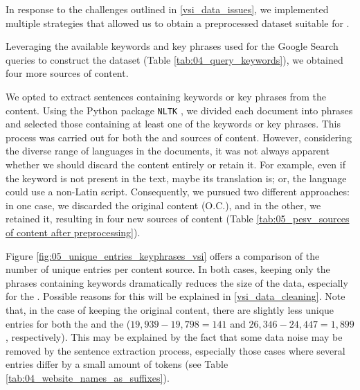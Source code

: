 \label{vsi_preprocessing}

In response to the challenges outlined in \headerName{} \ref{vsi_data_issues}, we implemented multiple strategies that allowed us to obtain a preprocessed dataset suitable for \textclassification{}.

\label{vsi_leveraging_keywords}

Leveraging the available keywords and key phrases used for the Google Search queries to construct the dataset (Table \ref{tab:04_query_keywords}), we obtained four more sources of content. 


We opted to extract sentences containing keywords or key phrases from the content. Using the Python package \texttt{NLTK} , we divided each document into phrases and selected those containing at least one of the keywords or key phrases. This process was carried out for both the \trafilaturaAbstract{} and \trafilaturaFulltext{} sources of content. However, considering the diverse range of languages in the documents, it was not always apparent whether we should discard the content entirely or retain it. For example, even if the keyword is not present in the text, maybe its translation is; or, the language could use a non-Latin script. Consequently, we pursued two different approaches: in one case, we discarded the original content (O.C.), and in the other, we retained it, resulting in four new sources of content (Table \ref{tab:05_pesv_sources of content after preprocessing}).




Figure \ref{fig:05_unique_entries_keyphrases_vsi} offers a comparison of the number of unique entries per content source. In both cases, keeping only the phrases containing keywords dramatically reduces the size of the data, especially for the \trafilaturaAbstract{}. Possible reasons for this will be explained in \headerName{} \ref{vsi_data_cleaning}. Note that, in the case of keeping the original content, there are slightly less unique entries for both the \trafilaturaAbstract{} and the \trafilaturaFulltext{} ($19,939-19,798 = 141$ and $26,346-24,447=1,899$, respectively). This may be explained by the fact that some data noise may be removed by the sentence extraction process, especially those cases where several entries differ by a small amount of tokens (see Table \ref{tab:04_website_names_as_suffixes}).

